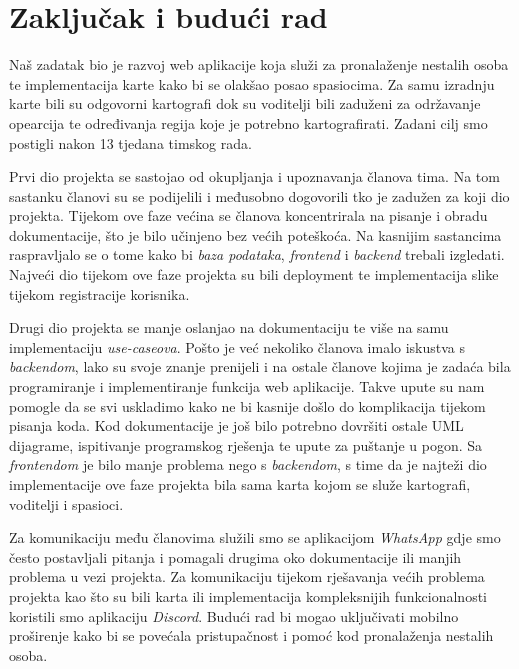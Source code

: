 

\chapter{Zaključak i budući rad}
		
		Naš zadatak bio je razvoj web aplikacije koja služi za pronalaženje nestalih osoba te implementacija karte kako bi se olakšao posao spasiocima. Za samu izradnju karte bili su odgovorni kartografi dok su voditelji bili zaduženi za održavanje opearcija te određivanja regija koje je potrebno kartografirati. Zadani cilj smo postigli nakon 13 tjedana timskog rada.

        Prvi dio projekta se sastojao od okupljanja i upoznavanja članova tima. Na tom sastanku članovi su se podijelili i međusobno dogovorili tko je zadužen za koji dio projekta. Tijekom ove faze većina se članova koncentrirala na pisanje i obradu dokumentacije, što je bilo učinjeno bez većih poteškoća. Na kasnijim sastancima raspravljalo se o tome kako bi \textit{baza podataka}, \textit{frontend} i \textit{backend} trebali izgledati. Najveći dio tijekom ove faze projekta su bili deployment te implementacija slike tijekom registracije korisnika.

        Drugi dio projekta se manje oslanjao na dokumentaciju te više na samu implementaciju \textit{use-caseova}. Pošto je već nekoliko članova imalo iskustva s \textit{backendom}, lako su svoje znanje prenijeli i na ostale članove kojima je zadaća bila programiranje i implementiranje funkcija web aplikacije. Takve upute su nam pomogle da se svi uskladimo kako ne bi kasnije došlo do komplikacija tijekom pisanja koda. Kod dokumentacije je još bilo potrebno dovršiti ostale UML dijagrame, ispitivanje programskog rješenja te upute za puštanje u pogon. Sa \textit{frontendom} je bilo manje problema nego s \textit{backendom}, s time da je najteži dio implementacije ove faze projekta bila sama karta kojom se služe kartografi, voditelji i spasioci.

        Za komunikaciju među članovima služili smo se aplikacijom \textit{WhatsApp} gdje smo često postavljali pitanja i pomagali drugima oko dokumentacije ili manjih problema u vezi projekta. Za komunikaciju tijekom rješavanja većih problema projekta kao što su bili karta ili implementacija kompleksnijih funkcionalnosti koristili smo aplikaciju \textit{Discord}. Budući rad bi mogao uključivati mobilno proširenje kako bi se povećala pristupačnost i pomoć kod pronalaženja nestalih osoba.

